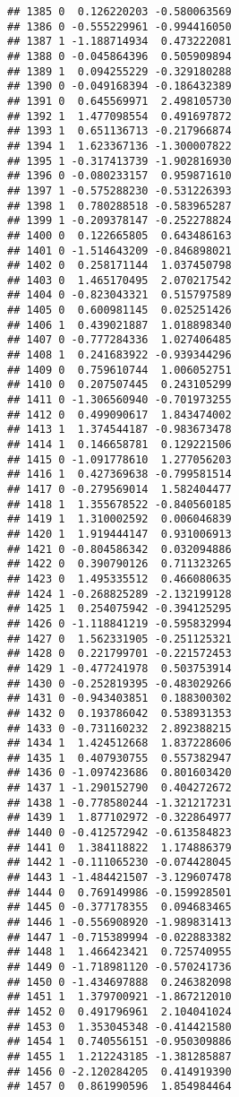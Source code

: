 \documentclass[
]{article}
\begin{document}
\begin{verbatim}
## 1385 0  0.126220203 -0.580063569
## 1386 0 -0.555229961 -0.994416050
## 1387 1 -1.188714934  0.473222081
## 1388 0 -0.045864396  0.505909894
## 1389 1  0.094255229 -0.329180288
## 1390 0 -0.049168394 -0.186432389
## 1391 0  0.645569971  2.498105730
## 1392 1  1.477098554  0.491697872
## 1393 1  0.651136713 -0.217966874
## 1394 1  1.623367136 -1.300007822
## 1395 1 -0.317413739 -1.902816930
## 1396 0 -0.080233157  0.959871610
## 1397 1 -0.575288230 -0.531226393
## 1398 1  0.780288518 -0.583965287
## 1399 1 -0.209378147 -0.252278824
## 1400 0  0.122665805  0.643486163
## 1401 0 -1.514643209 -0.846898021
## 1402 0  0.258171144  1.037450798
## 1403 0  1.465170495  2.070217542
## 1404 0 -0.823043321  0.515797589
## 1405 0  0.600981145  0.025251426
## 1406 1  0.439021887  1.018898340
## 1407 0 -0.777284336  1.027406485
## 1408 1  0.241683922 -0.939344296
## 1409 0  0.759610744  1.006052751
## 1410 0  0.207507445  0.243105299
## 1411 0 -1.306560940 -0.701973255
## 1412 0  0.499090617  1.843474002
## 1413 1  1.374544187 -0.983673478
## 1414 1  0.146658781  0.129221506
## 1415 0 -1.091778610  1.277056203
## 1416 1  0.427369638 -0.799581514
## 1417 0 -0.279569014  1.582404477
## 1418 1  1.355678522 -0.840560185
## 1419 1  1.310002592  0.006046839
## 1420 1  1.919444147  0.931006913
## 1421 0 -0.804586342  0.032094886
## 1422 0  0.390790126  0.711323265
## 1423 0  1.495335512  0.466080635
## 1424 1 -0.268825289 -2.132199128
## 1425 1  0.254075942 -0.394125295
## 1426 0 -1.118841219 -0.595832994
## 1427 0  1.562331905 -0.251125321
## 1428 0  0.221799701 -0.221572453
## 1429 1 -0.477241978  0.503753914
## 1430 0 -0.252819395 -0.483029266
## 1431 0 -0.943403851  0.188300302
## 1432 0  0.193786042  0.538931353
## 1433 0 -0.731160232  2.892388215
## 1434 1  1.424512668  1.837228606
## 1435 1  0.407930755  0.557382947
## 1436 0 -1.097423686  0.801603420
## 1437 1 -1.290152790  0.404272672
## 1438 1 -0.778580244 -1.321217231
## 1439 1  1.877102972 -0.322864977
## 1440 0 -0.412572942 -0.613584823
## 1441 0  1.384118822  1.174886379
## 1442 1 -0.111065230 -0.074428045
## 1443 1 -1.484421507 -3.129607478
## 1444 0  0.769149986 -0.159928501
## 1445 0 -0.377178355  0.094683465
## 1446 1 -0.556908920 -1.989831413
## 1447 1 -0.715389994 -0.022883382
## 1448 1  1.466423421  0.725740955
## 1449 0 -1.718981120 -0.570241736
## 1450 0 -1.434697888  0.246382098
## 1451 1  1.379700921 -1.867212010
## 1452 0  0.491796961  2.104041024
## 1453 0  1.353045348 -0.414421580
## 1454 1  0.740556151 -0.950309886
## 1455 1  1.212243185 -1.381285887
## 1456 0 -2.120284205  0.414919390
## 1457 0  0.861990596  1.854984464

\end{verbatim}
\end{document}
